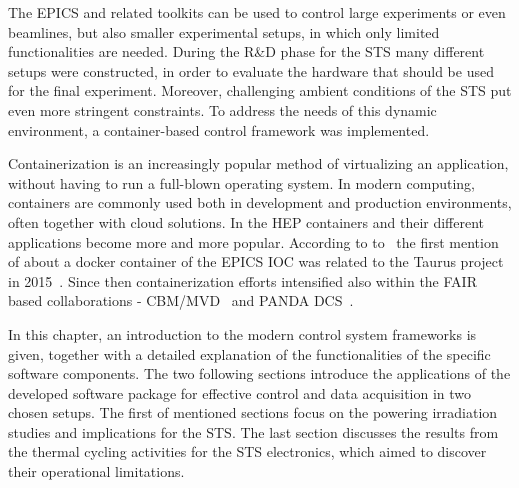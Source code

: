 
The \gls{EPICS} and related toolkits can be used to control large experiments or even beamlines, but also smaller experimental setups, in which only limited functionalities are needed. During the R\&D phase for the \gls{STS} many different setups were constructed, in order to evaluate the hardware that should be used for the final experiment. Moreover, challenging ambient conditions of the STS put even more stringent constraints. To address the needs of this dynamic environment, a container-based control framework was implemented. 

Containerization is an increasingly popular method of virtualizing an application, without having to run a full-blown operating system. In modern computing, containers are commonly used both in development and production environments, often together with cloud solutions. In the \gls{HEP} containers and their different applications become more and more popular. According to to~\cite{Klaus2021} the first mention of about a docker container of the \gls{EPICS} \gls{IOC} was related to the Taurus project in 2015~\cite{taurus}. Since then containerization efforts intensified also within the \gls{FAIR} based collaborations - \gls{CBM}/\gls{MVD}~\cite{Klaus2021} and PANDA DCS~\cite{PANDA_1}.

In this chapter, an introduction to the modern control system frameworks is given, together with a detailed explanation of the functionalities of the specific software components. The two following sections introduce the applications of the developed software package for effective control and data acquisition in two chosen setups. The first of mentioned sections focus on the powering irradiation studies and implications for the STS. The last section discusses the results from the thermal cycling activities for the STS electronics, which aimed to discover their operational limitations.
  
